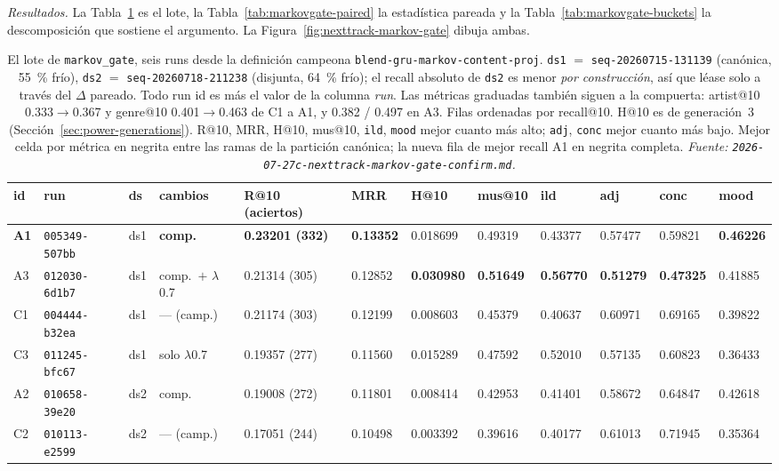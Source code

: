 \documentclass[11pt]{article}
\newcommand{\runid}[1]{\texttt{\small\seqsplit{#1}}}
\newcommand{\dsid}[1]{\texttt{\small #1}}
\newcommand{\best}[1]{\textbf{#1}}
\begin{document}
\emph{Resultados.} La Tabla~\ref{tab:markovgate} es el lote, la
Tabla~\ref{tab:markovgate-paired} la estadística pareada y la
Tabla~\ref{tab:markovgate-buckets} la descomposición que sostiene el argumento.
La Figura~\ref{fig:nexttrack-markov-gate} dibuja ambas.

\begin{table}[ht]
  \centering
  \caption{El lote de \texttt{markov\_gate}, seis runs desde la definición campeona
  \texttt{blend-gru-markov-content-proj}. \dsid{ds1} $=$
  \dsid{seq-20260715-131139} (canónica, \SI{55}{\percent} frío), \dsid{ds2} $=$
  \dsid{seq-20260718-211238} (disjunta, \SI{64}{\percent} frío); el recall
  absoluto de \dsid{ds2} es menor \emph{por construcción}, así que léase solo a
  través del $\Delta$ pareado. Todo run id es \protect\runid{run-20260728-} más el
  valor de la columna \emph{run}. Las métricas graduadas también siguen a la
  compuerta: artist@10 \num{0.333}$\to$\num{0.367} y genre@10
  \num{0.401}$\to$\num{0.463} de C1 a A1, y \num{0.382} / \num{0.497} en A3. Filas
  ordenadas por recall@10. H@10 es de generación~3
  (Sección~\ref{sec:power-generations}). R@10, MRR, H@10, mus@10, \texttt{ild},
  \texttt{mood} mejor cuanto más alto; \texttt{adj}, \texttt{conc} mejor cuanto más
  bajo. Mejor celda por métrica en negrita entre las ramas de la partición
  canónica; la nueva fila de mejor recall A1 en negrita completa.
  \emph{Fuente: \texttt{2026-07-27c-nexttrack-markov-gate-confirm.md}.}}
  \label{tab:markovgate}
  {\scriptsize\setlength{\tabcolsep}{1.6pt}\begin{tabular}{llllllllllll}
    \toprule
    id & run & ds & cambios & R@10 (aciertos) & MRR & H@10 & mus@10 & ild & adj & conc & mood \\
    \midrule
    \best{A1} & \texttt{005349-507bb} & ds1 & \best{comp.} & \best{0.23201 (332)} & \best{0.13352} & 0.018699 & 0.49319 & 0.43377 & 0.57477 & 0.59821 & \best{0.46226} \\
    A3 & \texttt{012030-6d1b7} & ds1 & comp.\ $+$ $\lambda$0.7 & 0.21314 (305) & 0.12852 & \best{0.030980} & \best{0.51649} & \best{0.56770} & \best{0.51279} & \best{0.47325} & 0.41885 \\
    C1 & \texttt{004444-b32ea} & ds1 & --- (camp.) & 0.21174 (303) & 0.12199 & 0.008603 & 0.45379 & 0.40637 & 0.60971 & 0.69165 & 0.39822 \\
    C3 & \texttt{011245-bfc67} & ds1 & solo $\lambda$0.7 & 0.19357 (277) & 0.11560 & 0.015289 & 0.47592 & 0.52010 & 0.57135 & 0.60823 & 0.36433 \\
    A2 & \texttt{010658-39e20} & ds2 & comp. & 0.19008 (272) & 0.11801 & 0.008414 & 0.42953 & 0.41401 & 0.58672 & 0.64847 & 0.42618 \\
    C2 & \texttt{010113-e2599} & ds2 & --- (camp.) & 0.17051 (244) & 0.10498 & 0.003392 & 0.39616 & 0.40177 & 0.61013 & 0.71945 & 0.35364 \\
    \bottomrule
  \end{tabular}}
\end{table}
\end{document}
